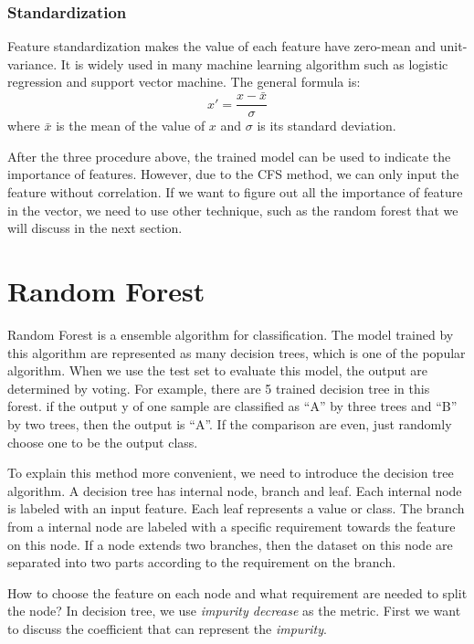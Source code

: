 \subsubsection{Standardization}
Feature standardization makes the value of each feature have zero-mean and unit-variance. It is widely used in many machine learning algorithm such as logistic regression and support vector machine. The general formula is:
\begin{equation} \label{standardization}
x'=\frac{x-\bar{x}}{\sigma}
\end{equation}
where $\bar{x}$ is the mean of the value of $x$ and $\sigma$ is its standard deviation.

After the three procedure above, the trained model can be used to indicate the importance of features. However, due to the CFS method, we can only input the feature without correlation. If we want to figure out all the importance of feature in the vector, we need to use other technique, such as the random forest that we will discuss in the next section.

\section{Random Forest}
Random Forest is a ensemble algorithm for classification. The model trained by this algorithm are represented as many decision trees, which is one of the popular algorithm\cite{safavian1991survey}. When we use the test set to evaluate this model, the output are determined by voting. For example, there are 5 trained decision tree in this forest. if the output y of one sample are classified as ``A'' by three trees and ``B'' by two trees, then the output is ``A''. If the comparison are even, just randomly choose one to be the output class.

To explain this method more convenient, we need to introduce the decision tree algorithm. A decision tree has internal node, branch and leaf. Each internal node is labeled with an input feature. Each leaf represents a value or class. The branch from a internal node are labeled with a specific requirement towards the feature on this node. If a node extends two branches, then the dataset on this node are separated into two parts according to the requirement on the branch.

How to choose the feature on each node and what requirement are needed to split the node? In decision tree, we use \textit{impurity decrease} as the metric. First we want to discuss the coefficient that can represent the \textit{impurity}.
